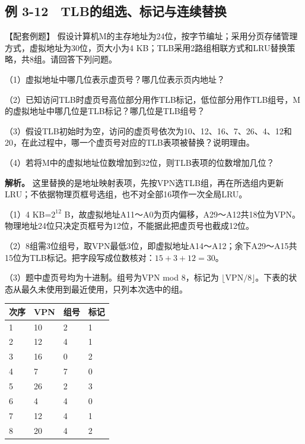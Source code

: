\subsection{例 3-12　TLB的组选、标记与连续替换}\label{CO03-30}

\begin{example}[配套例题]

【配套例题】 假设计算机M的主存地址为24位，按字节编址；采用分页存储管理方式，虚拟地址为30位，页大小为4 KB；TLB采用2路组相联方式和LRU替换策略，共8组。请回答下列问题。

（1）虚拟地址中哪几位表示虚页号？哪几位表示页内地址？

（2）已知访问TLB时虚页号高位部分用作TLB标记，低位部分用作TLB组号，M的虚拟地址中哪几位是TLB标记？哪几位是TLB组号？

（3）假设TLB初始时为空，访问的虚页号依次为10、12、16、7、26、4、12和20，在此过程中，哪一个虚页号对应的TLB表项被替换？说明理由。

（4）若将M中的虚拟地址位数增加到32位，则TLB表项的位数增加几位？

\end{example}

\textbf{解析。} 这里替换的是地址映射表项，先按VPN选TLB组，再在所选组内更新LRU；不依据物理页框号选组，也不对全部16项作一次全局LRU。

（1）4 KB=\(2^{12}\) B，故虚拟地址A11～A0为页内偏移，A29～A12共18位为VPN。物理地址24位只决定页框号为12位，不能据此把虚页号也截成12位。

（2）8组需3位组号，取VPN最低3位，即虚拟地址A14～A12；余下A29～A15共15位为TLB标记。把字段写成位数核对：\(15+3+12=30\)。

（3）题中虚页号均为十进制。组号为VPN mod 8，标记为 \(\lfloor\mathrm{VPN}/8\rfloor\)。下表的状态从最久未使用到最近使用，只列本次选中的组。

\begin{wideblock}\par\medskip\noindent\begin{minipage}{\linewidth}\fontsize{9.3}{12}\selectfont\begin{tabularx}{\linewidth}{@{}YYYY@{}}
\toprule\noalign{}
次序 & VPN & 组号 & 标记 \\
\midrule\noalign{}


1 & 10 & 2 & 1 \\
2 & 12 & 4 & 1 \\
3 & 16 & 0 & 2 \\
4 & 7 & 7 & 0 \\
5 & 26 & 2 & 3 \\
6 & 4 & 4 & 0 \\
7 & 12 & 4 & 1 \\
8 & 20 & 4 & 2 \\
\bottomrule\end{tabularx}
\end{minipage}\par\medskip\end{wideblock}

